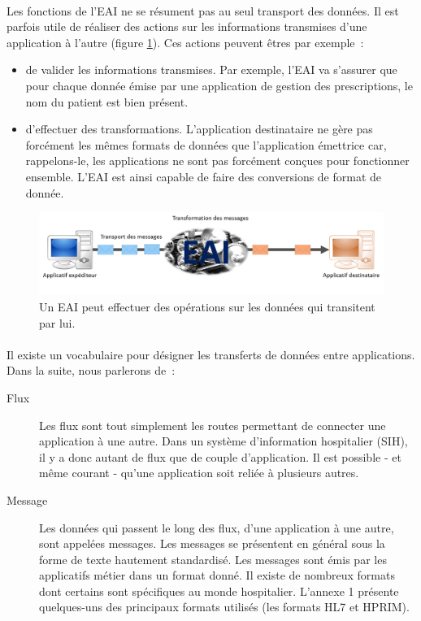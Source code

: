 			\paragraph{}%
			Les fonctions de l'EAI ne se résument pas au seul transport des données. Il
			est parfois utile de réaliser des actions sur les informations transmises
			d'une application à l'autre (figure \ref{interop_transfo}). Ces actions
			peuvent êtres par exemple~:\newline
			\begin{itemize}
			  \item de valider les informations transmises. Par exemple, l'EAI va
			  s'assurer que pour chaque donnée émise par une application de gestion des
			  prescriptions, le nom du patient est bien présent.
			  \item d'effectuer des transformations. L'application destinataire ne
			  gère pas forcément les mêmes formats de données que l'application émettrice
			  car, rappelons-le, les applications ne sont pas forcément conçues pour
			  fonctionner ensemble. L'EAI est ainsi capable de faire des conversions de
			  format de donnée.\newline
			\end{itemize}
			\begin{figure}[H]
				\centering
				\includegraphics[width=15cm]{../img/eai_2.png}
				\caption{\label{interop_transfo} Un EAI peut effectuer des opérations sur
				les données qui transitent par lui.}
			\end{figure}
			
			\paragraph{}%
 			Il existe un vocabulaire pour désigner les transferts de données entre
 			applications. Dans la suite, nous parlerons de~:
 			\begin{description}
 				\item[Flux] Les flux sont tout simplement les routes permettant de
 				connecter une application à une autre. Dans un système d'information hospitalier
 				(SIH), il y a donc autant de flux que de couple d'application. Il est
 				possible - et même courant - qu'une application soit reliée à plusieurs
 				autres.
 				\item[Message] Les données qui passent le long des flux, d'une application
 				à une autre, sont appelées messages. Les messages se présentent en général
 				sous la forme de texte hautement standardisé. Les messages sont émis par les
 				applicatifs métier dans un format donné. Il existe de nombreux formats
 				dont certains sont spécifiques au monde hospitalier. L'annexe 1 présente
 				quelques-uns des principaux formats utilisés (les formats HL7 et HPRIM).
 			\end{description}

